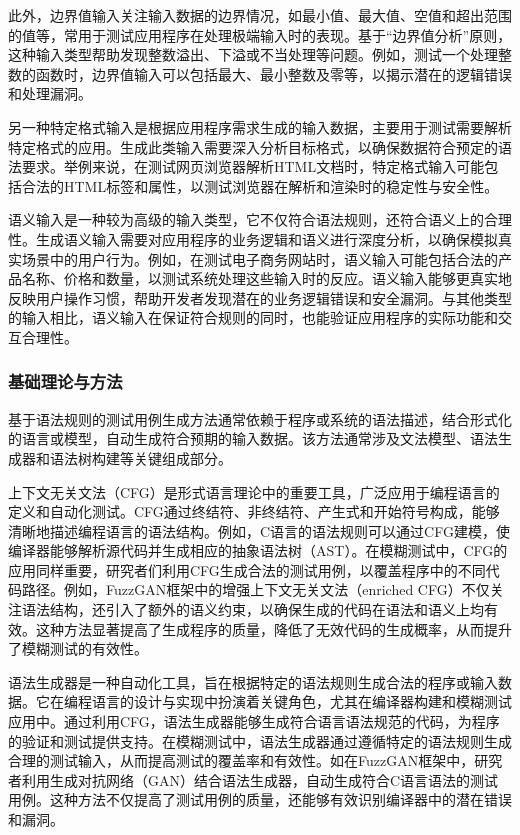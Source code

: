 \documentclass[10.5pt,compsoc]{CjC}
\theoremstyle{mystyle}
\begin{document}
此外，边界值输入关注输入数据的边界情况，如最小值、最大值、空值和超出范围的值等，常用于测试应用程序在处理极端输入时的表现。基于“边界值分析”原则，这种输入类型帮助发现整数溢出、下溢或不当处理等问题。例如，测试一个处理整数的函数时，边界值输入可以包括最大、最小整数及零等，以揭示潜在的逻辑错误和处理漏洞。

另一种特定格式输入是根据应用程序需求生成的输入数据，主要用于测试需要解析特定格式的应用。生成此类输入需要深入分析目标格式，以确保数据符合预定的语法要求。举例来说，在测试网页浏览器解析HTML文档时，特定格式输入可能包括合法的HTML标签和属性，以测试浏览器在解析和渲染时的稳定性与安全性。

语义输入是一种较为高级的输入类型，它不仅符合语法规则，还符合语义上的合理性。生成语义输入需要对应用程序的业务逻辑和语义进行深度分析，以确保模拟真实场景中的用户行为。例如，在测试电子商务网站时，语义输入可能包括合法的产品名称、价格和数量，以测试系统处理这些输入时的反应。语义输入能够更真实地反映用户操作习惯，帮助开发者发现潜在的业务逻辑错误和安全漏洞。与其他类型的输入相比，语义输入在保证符合规则的同时，也能验证应用程序的实际功能和交互合理性。
\vspace {10mm}
\subsubsection{基础理论与方法}

基于语法规则的测试用例生成方法通常依赖于程序或系统的语法描述，结合形式化的语言或模型，自动生成符合预期的输入数据。该方法通常涉及文法模型、语法生成器和语法树构建等关键组成部分。

上下文无关文法（CFG）是形式语言理论中的重要工具，广泛应用于编程语言的定义和自动化测试。CFG通过终结符、非终结符、产生式和开始符号构成，能够清晰地描述编程语言的语法结构。例如，C语言的语法规则可以通过CFG建模，使编译器能够解析源代码并生成相应的抽象语法树（AST）。在模糊测试中，CFG的应用同样重要，研究者们利用CFG生成合法的测试用例，以覆盖程序中的不同代码路径\cite{differential}。例如，FuzzGAN框架中的增强上下文无关文法（enriched CFG）不仅关注语法结构，还引入了额外的语义约束，以确保生成的代码在语法和语义上均有效。这种方法显著提高了生成程序的质量，降低了无效代码的生成概率，从而提升了模糊测试的有效性。

语法生成器是一种自动化工具，旨在根据特定的语法规则生成合法的程序或输入数据。它在编程语言的设计与实现中扮演着关键角色，尤其在编译器构建和模糊测试应用中。通过利用CFG，语法生成器能够生成符合语言语法规范的代码，为程序的验证和测试提供支持。在模糊测试中，语法生成器通过遵循特定的语法规则生成合理的测试输入，从而提高测试的覆盖率和有效性。如在FuzzGAN框架中，研究者利用生成对抗网络（GAN）结合语法生成器，自动生成符合C语言语法的测试用例。这种方法不仅提高了测试用例的质量，还能够有效识别编译器中的潜在错误和漏洞。
\end{document}
